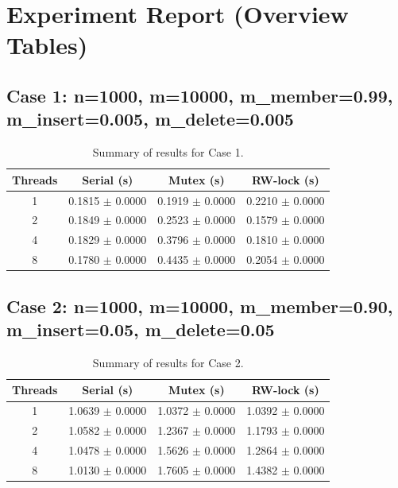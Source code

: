\documentclass{article}
\begin{document}
\section*{Experiment Report (Overview Tables)}
\subsection*{Case 1: n=1000, m=10000, m\_member=0.99, m\_insert=0.005, m\_delete=0.005}
\begin{table}[h!]
\centering
\begin{tabular}{cccc}
\toprule
\textbf{Threads} & \textbf{Serial (s)} & \textbf{Mutex (s)} & \textbf{RW-lock (s)} \\
\midrule
1 & 0.1815 $\pm$ 0.0000 & 0.1919 $\pm$ 0.0000 & 0.2210 $\pm$ 0.0000 \\
2 & 0.1849 $\pm$ 0.0000 & 0.2523 $\pm$ 0.0000 & 0.1579 $\pm$ 0.0000 \\
4 & 0.1829 $\pm$ 0.0000 & 0.3796 $\pm$ 0.0000 & 0.1810 $\pm$ 0.0000 \\
8 & 0.1780 $\pm$ 0.0000 & 0.4435 $\pm$ 0.0000 & 0.2054 $\pm$ 0.0000 \\
\bottomrule
\end{tabular}
\caption{Summary of results for Case 1.}
\label{tab:case1}
\end{table}
\subsection*{Case 2: n=1000, m=10000, m\_member=0.90, m\_insert=0.05, m\_delete=0.05}
\begin{table}[h!]
\centering
\begin{tabular}{cccc}
\toprule
\textbf{Threads} & \textbf{Serial (s)} & \textbf{Mutex (s)} & \textbf{RW-lock (s)} \\
\midrule
1 & 1.0639 $\pm$ 0.0000 & 1.0372 $\pm$ 0.0000 & 1.0392 $\pm$ 0.0000 \\
2 & 1.0582 $\pm$ 0.0000 & 1.2367 $\pm$ 0.0000 & 1.1793 $\pm$ 0.0000 \\
4 & 1.0478 $\pm$ 0.0000 & 1.5626 $\pm$ 0.0000 & 1.2864 $\pm$ 0.0000 \\
8 & 1.0130 $\pm$ 0.0000 & 1.7605 $\pm$ 0.0000 & 1.4382 $\pm$ 0.0000 \\
\bottomrule
\end{tabular}
\caption{Summary of results for Case 2.}
\label{tab:case2}
\end{table}
\end{document}
